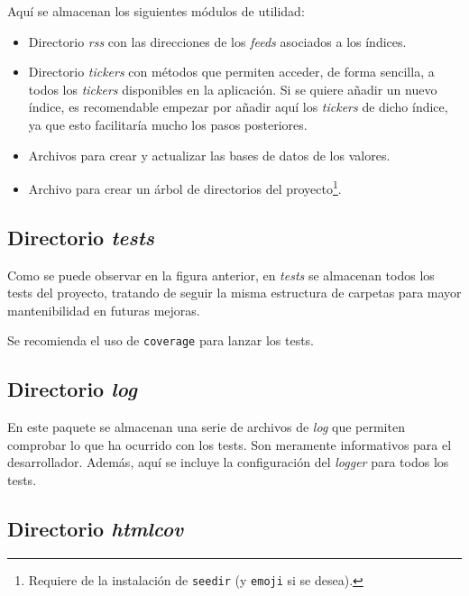 Aquí se almacenan los siguientes módulos de utilidad:

\begin{itemize}
\tightlist
\item
Directorio \emph{rss} con las direcciones de los \emph{feeds} asociados a los índices. 
\item
Directorio \emph{tickers} con métodos que permiten acceder, de forma sencilla, a todos los \emph{tickers} disponibles en la aplicación. Si se quiere añadir un nuevo índice, es recomendable empezar por añadir aquí los \emph{tickers} de dicho índice, ya que esto facilitaría mucho los pasos posteriores. 
\item
Archivos para crear y actualizar las bases de datos de los valores. 
\item
Archivo para crear un árbol de directorios del proyecto\footnote{Requiere de la instalación de \texttt{seedir} (y \texttt{emoji} si se desea).}.
\end{itemize}


\subsection{Directorio \emph{tests}}


Como se puede observar en la figura anterior, en \emph{tests} se almacenan todos los tests del proyecto, tratando de seguir la misma estructura de carpetas para mayor mantenibilidad en futuras mejoras. 

Se recomienda el uso de \texttt{coverage} para lanzar los tests.


\subsection{Directorio \emph{log}}

En este paquete se almacenan una serie de archivos de \emph{log} que permiten comprobar lo que ha ocurrido con los tests. Son meramente informativos para el desarrollador. Además, aquí se incluye la configuración del \emph{logger} para todos los tests.



\subsection{Directorio \emph{htmlcov}}

